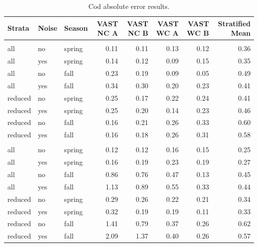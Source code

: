 \documentclass[
  12pt,
]{article}
\begin{document}
\begin{table}

\caption{\label{tab:CodERROR}Cod absolute error results.}
\centering
\fontsize{10}{12}\selectfont
\begin{tabular}[t]{lllrrrrr}
\toprule
Strata & Noise & Season & VAST NC  A & VAST NC  B & VAST WC A & VAST WC B & Stratified Mean\\
\midrule
\addlinespace[0.3em]
\multicolumn{1}{l}{\textbf{Constant Temp.}}\\
\hspace{1em}all & no & spring & 0.11 & 0.11 & 0.13 & 0.12 & 0.36\\
\hspace{1em}all & yes & spring & 0.14 & 0.12 & 0.09 & 0.15 & 0.35\\
\hspace{1em}all & no & fall & 0.23 & 0.19 & 0.09 & 0.05 & 0.49\\
\hspace{1em}all & yes & fall & 0.34 & 0.30 & 0.20 & 0.23 & 0.41\\
\hspace{1em}reduced & no & spring & 0.25 & 0.17 & 0.22 & 0.24 & 0.41\\
\hspace{1em}reduced & yes & spring & 0.25 & 0.20 & 0.14 & 0.23 & 0.46\\
\hspace{1em}reduced & no & fall & 0.16 & 0.21 & 0.26 & 0.33 & 0.60\\
\hspace{1em}reduced & yes & fall & 0.16 & 0.18 & 0.26 & 0.31 & 0.58\\
\addlinespace[0.3em]
\multicolumn{1}{l}{\textbf{Increasing Temp.}}\\
\hspace{1em}all & no & spring & 0.12 & 0.12 & 0.16 & 0.15 & 0.25\\
\hspace{1em}all & yes & spring & 0.16 & 0.19 & 0.23 & 0.19 & 0.27\\
\hspace{1em}all & no & fall & 0.86 & 0.76 & 0.47 & 0.13 & 0.45\\
\hspace{1em}all & yes & fall & 1.13 & 0.89 & 0.55 & 0.33 & 0.44\\
\hspace{1em}reduced & no & spring & 0.29 & 0.26 & 0.22 & 0.21 & 0.34\\
\hspace{1em}reduced & yes & spring & 0.32 & 0.19 & 0.19 & 0.11 & 0.33\\
\hspace{1em}reduced & no & fall & 1.41 & 0.79 & 0.37 & 0.26 & 0.62\\
\hspace{1em}reduced & yes & fall & 2.09 & 1.37 & 0.40 & 0.26 & 0.57\\
\bottomrule
\end{tabular}
\end{table}
\end{document}
